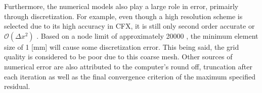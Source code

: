 Furthermore, the numerical models also play a large role in error, primairly through discretization. For example, even though a high resolution scheme is selected due to its high accuracy in CFX, it is still only second order accurate or $\mathcal{O} (\Delta x^2)$ \cite{cfdbook}. Based on a node limit of approximately 20000 \cite{proj}, the minimum element size of 1 [mm] will cause some discretization error. This being said, the grid quality is considered to be poor due to this coarse mesh. Other sources of numerical error are also attributed to the computer's round off, truncation after each iteration as well as the final convergence criterion of the maximum specified residual.
